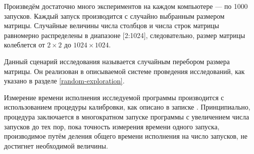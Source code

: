 Произведём достаточно много экспериментов на каждом компьютере --- по 1000 запусков. Каждый запуск производится с случайно выбранным размером матрицы. Случайные величины числа столбцов и числа строк матрицы равномерно распределены в диапазоне [2:1024], следовательно, размер матрицы колеблется от $2 \times 2$ до $1024 \times 1024$.

Данный сценарий исследования называется случайным перебором размера матрицы. Он реализован в описываемой системе проведения исследований, как указано в разделе \ref{random-exploration}.

Измерение времени исполнения исследуемой программы производится с использованием процедуры калибровки, как описано в записке \cite{adaptor}. Принципиально, процедура заключается в многократном запуске программы с увеличением числа запусков до тех пор, пока точность измерения времени одного запуска, производимое путём деления общего времени исполнения на число запусков, не достигнет необходимой величины.
